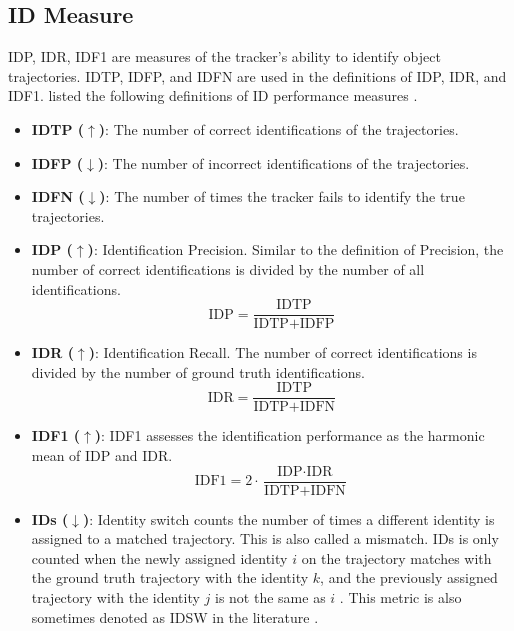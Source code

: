 \begin{itemize}
\end{itemize}


\subsection{ID Measure}
IDP, IDR, IDF1 are measures of the tracker's ability to identify object trajectories. IDTP, IDFP, and IDFN are used in the definitions of IDP, IDR, and IDF1. \citeauthor{ristani_performance_2016} listed the following definitions of ID performance measures \cite{ristani_performance_2016}.

\begin{itemize}

\item \textbf{IDTP ($\uparrow$)}: The number of correct identifications of the trajectories.

\item \textbf{IDFP ($\downarrow$)}: The number of incorrect identifications of the trajectories.

\item \textbf{IDFN ($\downarrow$)}: The number of times the tracker fails to identify the true trajectories.

\item \textbf{IDP ($\uparrow$)}: Identification Precision. Similar to the definition of Precision, the number of correct identifications is divided by the number of all identifications.
\begin{equation}
\text{IDP} = \frac{\text{IDTP}}{\text{IDTP} + \text{IDFP}}
\label{eqn:IDP}
\end{equation}

\item \textbf{IDR ($\uparrow$)}: Identification Recall. The number of correct identifications is divided by the number of ground truth identifications.
\begin{equation}
\text{IDR} = \frac{\text{IDTP}}{\text{IDTP} + \text{IDFN}}
\label{eqn:IDR}
\end{equation}

\item \textbf{IDF1 ($\uparrow$)}: IDF1 assesses the identification performance as the harmonic mean of IDP and IDR. 
\begin{equation}
\text{IDF1} = 2 \cdot \frac{\text{IDP} \cdot \text{IDR}}{\text{IDTP} + \text{IDFN}}
\label{eqn:IDF1}
\end{equation}

\item \textbf{IDs ($\downarrow$)}: Identity switch counts the number of times a different identity is assigned to a matched trajectory. This is also called a mismatch. IDs is only counted when the newly assigned identity $\textit{i}$ on the trajectory matches with the ground truth trajectory with the identity $\textit{k}$, and the previously assigned trajectory with the identity $\textit{j}$ is not the same as $\textit{i}$ \cite{milan_mot16_2016}. This metric is also sometimes denoted as IDSW in the literature \cite{milan_mot16_2016}.
\end{itemize}



